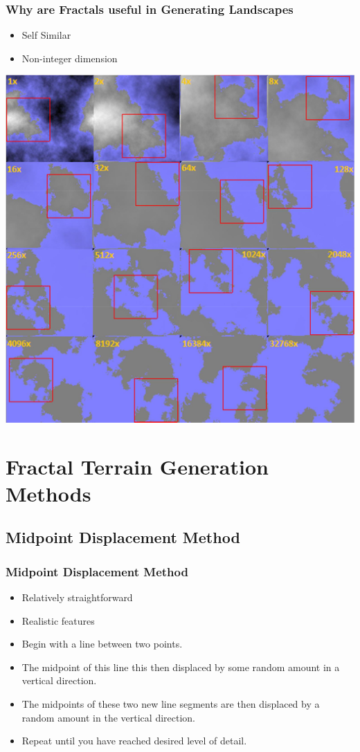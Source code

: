 \documentclass{beamer}
\begin{document}
\begin{frame}
\frametitle{Why are Fractals useful in Generating Landscapes}
\begin{itemize}
\item Self Similar
\item Non-integer dimension
\end{itemize}
\begin{center}
\includegraphics[scale=0.13]{SelfSimilarity.jpg}
\end{center}
\end{frame}


\section{Fractal Terrain Generation Methods}
\subsection{Midpoint Displacement Method}

\begin{frame}
  \frametitle{Midpoint Displacement Method}
\begin{itemize}
 \item Relatively straightforward
 \item Realistic features
\item Begin with a line between two points.
\item The midpoint of this line this then displaced by some random amount in a vertical direction.
\item The midpoints of these two new line segments are then displaced by a random amount in the vertical direction.
\item Repeat until you have reached desired level of detail.
\end{itemize}
\end{frame}
\end{document}
